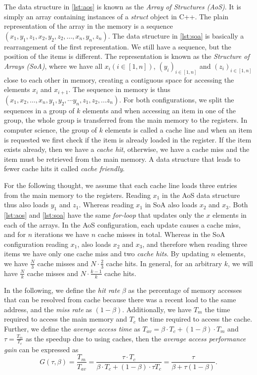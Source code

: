 The data structure in \autoref{lst:aos} is known as the \emph{Array of Structures (AoS)}. It is simply an array containing instances of a \emph{struct} object in C++. The plain representation of the array in the memory is a sequence $(x_1, y_1, z_1, x_2, y_2, z_2, \dots, x_n, y_n, z_n)$. The data structure in \autoref{lst:soa} is basically a rearrangement of the first representation. We still have a sequence, but the position of the items is different. The representation is known as the \emph{Structure of Arrays (SoA)}, where we have all $x_i (i \in[1, n])$, $(y_i)_{i \in[1, n]}$ and $(z_i)_{i \in[1, n]}$ close to each other in memory, creating a contiguous space for accessing the elements $x_i$ and $x_{i+1}$. The sequence in memory is thus $(x_1, x_{2}, \dots, x_n, y_1, y_{2}, \cdots y_{n}, z_1, z_2,... z_n)$.  For both configurations, we split the sequences in a group of $k$ elements and when accessing an item in one of the group, the whole group is transferred from the main memory to the registers. In computer science, the group of $k$ elements is called a cache line and when an item is requested we first check if the item is already loaded in the register. If the item exists already, then we have a \emph{cache hit}, otherwise, we have a cache miss and the item must be retrieved from the main memory. A data structure that leads to fewer cache hits it called \emph{cache friendly}.

For the following thought, we assume that each cache line loads three entries from the main memory to the registers. Reading $x_1$ in the AoS data structure thus also loads $y_1$ and $z_1$. Whereas reading $x_1$ in SoA also loads $x_2$ and $x_3$. Both \autoref{lst:aos} and \autoref{lst:soa} have the same \emph{for-loop} that updates only the $x$ elements in each of the arrays. In the AoS configuration, each update causes a cache miss, and for $n$ iterations we have $n$ cache misses in total. Whereas in the SoA configuration reading $x_1$, also loads $x_2$ and $x_3$, and therefore when reading three items we have only one cache miss and two \emph{cache hits}. By updating $n$ elements, we have $\frac{N}{3}$ cache misses and $N \cdot \frac{2}{3}$ cache hits. In general, for an arbitrary $k$, we will have $\frac{N}{k}$ cache misses and $N \cdot \frac{k-1}{k}$ cache hits.

In the following, we define the \emph{hit rate} $\beta$ as the percentage of memory accesses that can be resolved from cache because there was a recent load to the same address, and the \emph{miss rate} as $(1 - \beta)$. Additionally, we have $T_m$ the time required to access the main memory and $T_c$ the time required to access the cache. Further, we define the \emph{average access time} as $T_{av} = \beta \cdot T_c + (1 - \beta) \cdot T_m$ and $\tau = \frac{T_m}{T_c}$ as the speedup due to using caches, then the \emph{average access performance gain} can be expressed as $$G(\tau, \beta) = \frac{T_m}{T_{av}} = \frac{\tau \cdot T_c}{\beta \cdot T_c + (1 - \beta)\cdot \tau T_c} = \frac{\tau}{\beta + \tau (1 - \beta)}.$$

